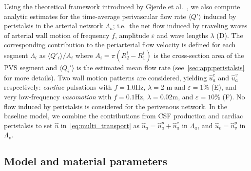 \documentclass[fleqn,10pt]{wlscirep}
\begin{document}
Using the theoretical framework introduced by Gjerde et
al.~\cite{gjerde2023directional}, we also compute analytic estimates
for the time-average perivascular flow rate $\langle Q' \rangle$
induced by peristalsis in the arterial network $\Lambda_a$; i.e.~the
net flow induced by traveling waves of arterial wall motion of
frequency $f$, amplitude $\varepsilon$ and wave lengths $\lambda$
(D). The corresponding contribution to the periarterial
flow velocity is defined for each segment $\Lambda_i$ as $\langle Q'_i
\rangle/A_i$ where $A_i = \pi (R_2^i - R_1^i)$ is the cross-section
area of the PVS segment and $\langle Q_i' \rangle$ is the estimated
mean flow rate (see~\ref{sec:app:peristalsis} for more details). Two
wall motion patterns are considered, yielding $\hat{u}_a^c$ and
$\hat{u}_a^v$ respectively: \emph{cardiac} pulsations with $f =
1.0$Hz, $\lambda = 2$ m and $\varepsilon = 1\%$ (E), and
very low-frequency \emph{vasomotion} with $f = 0.1$Hz, $\lambda =
0.02$m, and $\varepsilon = 10\%$ (F). No flow induced by
peristalsis is considered for the perivenous network. In the baseline
model, we combine the contributions from CSF production and cardiac
peristalsis to set $\hat{u}$ in~\eqref{eq:multi_transport} as
$\hat{u}_a = \hat{u}_a^p + \hat{u}_a^c$ in $\Lambda_a$, and $\hat{u}_v
= \hat{u}_v^p$ in $\Lambda_v$.


\subsection*{Model and material parameters}
\end{document}

